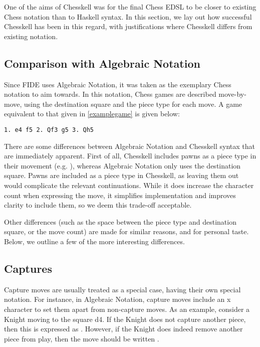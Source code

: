 One of the aims of Chesskell was for the final Chess EDSL to be closer to existing Chess notation than to Haskell syntax. In this section, we lay out how successful Chesskell has been in this regard, with justifications where Chesskell differs from existing notation.

\subsection{Comparison with Algebraic Notation}

Since FIDE uses Algebraic Notation, it was taken as the exemplary Chess notation to aim towards. In this notation, Chess games are described move-by-move, using the destination square and the piece type for each move. A game equivalent to that given in \cref{examplegame} is given below:

\begin{verbatim}
1. e4 f5 2. Qf3 g5 3. Qh5
\end{verbatim}

There are some differences between Algebraic Notation and Chesskell syntax that are immediately apparent. First of all, Chesskell includes pawns as a piece type in their movement (e.g. ), whereas Algebraic Notation only uses the destination square. Pawns are included as a piece type in Chesskell, as leaving them out would complicate the relevant continuations. While it does increase the character count when expressing the move, it simplifies implementation and improves clarity to include them, so we deem this trade-off acceptable.

Other differences (such as the space between the piece type and destination square, or the move count) are made for similar reasons, and for personal taste. Below, we outline a few of the more interesting differences.

\subsection{Captures}

Capture moves are usually treated as a special case, having their own special notation. For instance, in Algebraic Notation, capture moves include an x character to set them apart from non-capture moves. As an example, consider a Knight moving to the square d4. If the Knight does not capture another piece, then this is expressed as . However, if the Knight does indeed remove another piece from play, then the move should be written .

